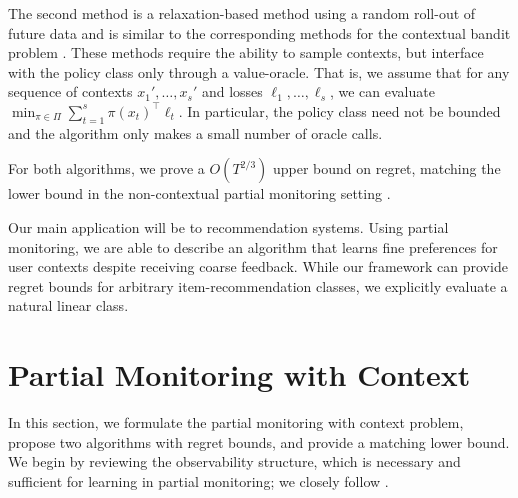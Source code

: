 \documentclass[11pt]{article}
\newcommand{\proj}{\mathrm{proj}}
\begin{document}
The second method is a relaxation-based method \cite{rakhlinrelax} using a random roll-out of future data and is similar to the corresponding methods for the contextual bandit problem \cite{rakhlin2016bistro,syrgkanis2016improved}. These methods require the ability to sample  contexts, but interface with the policy class only through a value-oracle. That is, we assume that for any sequence of contexts $x_1',\ldots, x_s'$ and losses $\ell_1,\ldots,\ell_s$, we can evaluate
$\min_{\pi\in\Pi} \sum_{t=1}^s \pi(x_t)^\top \ell_t$.
In particular, the policy class need not be bounded and the algorithm only makes a small number of oracle calls. 

For both algorithms, we prove a $O(T^{2/3})$ upper bound on regret, matching the lower bound in the non-contextual partial monitoring setting \cite{cesa2006regret}.

Our main application will be to recommendation systems. Using partial monitoring, we are able to describe an algorithm that learns fine preferences for user contexts despite receiving coarse feedback. While our framework can provide regret bounds for arbitrary item-recommendation classes, we explicitly evaluate a natural linear class.





\section{Partial Monitoring with Context}
In this section, we formulate the partial monitoring with context problem, propose two algorithms with regret bounds, and provide a matching lower bound. We begin by reviewing the  observability structure, which is necessary and sufficient for learning in partial monitoring; we closely follow \cite{bartok2014partial}.
\end{document}
